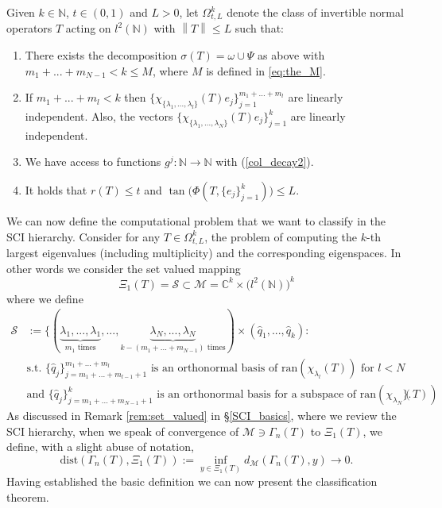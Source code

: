 \documentclass[a4paper,10pt]{article}
\begin{document}
\begin{definition}%
\label{complicate_def}
Given $k\in\mathbb{N}$, $t\in(0,1)$ and $L>0$, let $\Omega^k_{t,L}$ denote the class of invertible normal operators $T$ acting on $l^2(\mathbb{N})$ with $\left\|T\right\|\leq L$ such that:
\begin{enumerate}
	\item There exists the decomposition $\sigma(T) = \omega \cup \Psi$ as above with $m_1+...+m_{N-1}< k\leq M$, where $M$ is defined in \eqref{eq:the_M}.
	\item If $m_1+...+m_l<k$ then $\{\chi_{\{\lambda_1,...,\lambda_l\}}(T)e_j\}_{j=1}^{m_1+...+m_l}$ are linearly independent. Also, the vectors $\{\chi_{\{\lambda_1,...,\lambda_N\}}(T)e_j\}_{j=1}^{k}$ are linearly independent.
	\item We have access to functions $g^j:\mathbb{N}\rightarrow\mathbb{N}$ with (\ref{col_decay2}).
	\item It holds that $r(T)\leq t$ and $\tan\big(\Phi(T,\{e_j\}_{j=1}^k)\big)\leq L$.
\end{enumerate}
\end{definition}

We can now define the computational problem that we want to classify in the SCI hierarchy. Consider for any $T\in \Omega^k_{t,L}$, the problem of computing the $k$-th largest eigenvalues (including multiplicity) and the corresponding eigenspaces. In other words we consider the set valued mapping 
\[
\Xi_1(T) = \mathcal{S} \subset \mathcal{M} = \mathbb{C}^k\times \big(l^2(\mathbb{N})\big)^k
\]
where we define 
\begin{align*}
\mathcal{S}&:=\Big\{(\underbrace{\lambda_1,...,\lambda_1}_{\text{$m_1$ times}},...,\underbrace{\lambda_N,...,\lambda_N}_{\text{$k-(m_1+...+m_{N-1})$ times}})\times (\hat q_1,...,\hat q_k):\\
&\text{s.t. $\{\hat q_j\}_{j=m_1+...+m_{l-1}+1}^{m_1+...+m_l}$ is an orthonormal basis of $\mathrm{ran}(\chi_{\lambda_l}(T))$ for $l<N$}\\
&\text{and $\{\hat q_j\}_{j=m_1+...+m_{N-1}+1}^{k}$ is an orthonormal basis for a subspace of $\mathrm{ran}(\chi_{\lambda_N}(T))$}\Big\}.
\end{align*}
As discussed in Remark \ref{rem:set_valued} in \S \ref{SCI_basics}, where we review the SCI hierarchy, 
when we speak of convergence of $\mathcal{M}\ni\Gamma_n(T)$ to $\Xi_1(T)$, we define, with a slight abuse of notation, 
\[
\mathrm{dist}(\Gamma_n(T),\Xi_1(T)) := 
\inf_{y \in \Xi_1(T)} d_{\mathcal{M}}(\Gamma_n(T),y) \rightarrow 0. 
\]
%
Having established the basic definition we can now present the classification theorem. 
\end{document}
